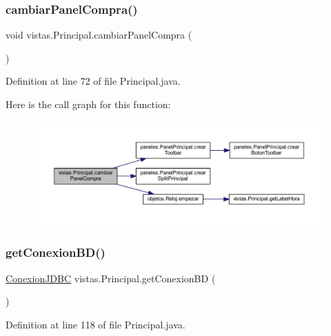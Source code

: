 \subsubsection{\texorpdfstring{cambiar\+Panel\+Compra()}{cambiarPanelCompra()}}
{\footnotesize\ttfamily void vistas.\+Principal.\+cambiar\+Panel\+Compra (\begin{DoxyParamCaption}{ }\end{DoxyParamCaption})}



Definition at line 72 of file Principal.\+java.

Here is the call graph for this function\+:
\nopagebreak
\begin{figure}[H]
\begin{center}
\leavevmode
\includegraphics[width=350pt]{classvistas_1_1_principal_aa6783bab03cc60f1bf401d4c16293318_cgraph}
\end{center}
\end{figure}
\mbox{\label{classvistas_1_1_principal_ad7379276c979124d4386d01439f24b42}} 
\subsubsection{\texorpdfstring{get\+Conexion\+B\+D()}{getConexionBD()}}
{\footnotesize\ttfamily \mbox{\hyperlink{classmysql_1_1_conexion_j_d_b_c}{Conexion\+J\+D\+BC}} vistas.\+Principal.\+get\+Conexion\+BD (\begin{DoxyParamCaption}{ }\end{DoxyParamCaption})}



Definition at line 118 of file Principal.\+java.

\mbox{\label{classvistas_1_1_principal_a95e7bccba557226e9e56211a58a2e03c}} 
